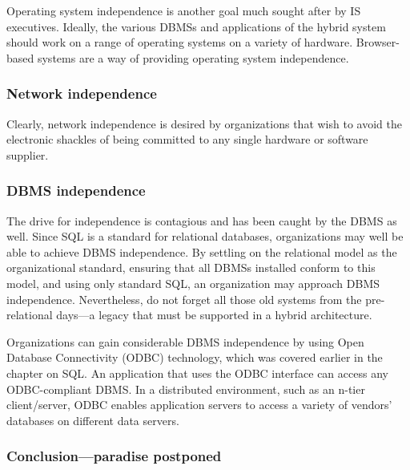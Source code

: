 \documentclass[
]{article}
\begin{document}
Operating system independence is another goal much sought after by IS
executives. Ideally, the various DBMSs and applications of the hybrid
system should work on a range of operating systems on a variety of
hardware. Browser-based systems are a way of providing operating system
independence.

\hypertarget{network-independence}{%
\subsubsection*{Network independence}\label{network-independence}}

Clearly, network independence is desired by organizations that wish to
avoid the electronic shackles of being committed to any single hardware
or software supplier.

\hypertarget{dbms-independence}{%
\subsubsection*{DBMS independence}\label{dbms-independence}}

The drive for independence is contagious and has been caught by the DBMS
as well. Since SQL is a standard for relational databases, organizations
may well be able to achieve DBMS independence. By settling on the
relational model as the organizational standard, ensuring that all DBMSs
installed conform to this model, and using only standard SQL, an
organization may approach DBMS independence. Nevertheless, do not forget
all those old systems from the pre-relational days---a legacy that must
be supported in a hybrid architecture.

Organizations can gain considerable DBMS independence by using Open
Database Connectivity (ODBC) technology, which was covered earlier in
the chapter on SQL. An application that uses the ODBC interface can
access any ODBC-compliant DBMS. In a distributed environment, such as an
n-tier client/server, ODBC enables application servers to access a
variety of vendors' databases on different data servers.

\hypertarget{conclusionparadise-postponed}{%
\subsubsection*{Conclusion---paradise postponed}\label{conclusionparadise-postponed}}
\end{document}
